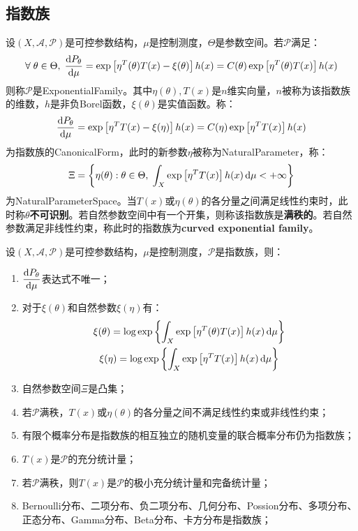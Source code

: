 \subsection{指数族}
\begin{definition}
	设$(X,\mathscr{A},\mathscr{P})$是可控参数结构，$\mu$是控制测度，$\Theta$是参数空间。若$\mathscr{P}$满足：
	\begin{equation*}
		\forall\;\theta\in\Theta,\;\frac{\mathop{}\!\mathrm{d} P_{\theta}}{\mathop{}\!\mathrm{d}\mu}=\exp\left[\eta^T(\theta)T(x)-\xi(\theta)\right]h(x)=C(\theta)\exp\left[\eta^T(\theta)T(x)\right]h(x)
	\end{equation*}
	则称$\mathscr{P}$是\gls{ExponentialFamily}。其中$\eta(\theta),T(x)$是$n$维实向量，$n$被称为该指数族的维数，$h$是非负Borel函数，$\xi(\theta)$是实值函数。称：
	\begin{equation*}
		\frac{\mathop{}\!\mathrm{d} P_{\theta}}{\mathop{}\!\mathrm{d}\mu}=\exp\left[\eta^TT(x)-\xi(\eta)\right]h(x)=C(\eta)\exp\left[\eta^TT(x)\right]h(x)
	\end{equation*}
	为指数族的\gls{CanonicalForm}，此时的新参数$\eta$被称为\gls{NaturalParameter}，称：
	\begin{equation*}
		\Xi=\left\{\eta(\theta):\theta\in\Theta,\;\int_{X}\exp\left[\eta^TT(x)\right]h(x)\mathop{}\!\mathrm{d}\mu<+\infty\right\}
	\end{equation*}
	为\gls{NaturalParameterSpace}。当$T(x)$或$\eta(\theta)$的各分量之间满足线性约束时，此时称$\theta$\textbf{不可识别}。若自然参数空间中有一个开集，则称该指数族是\textbf{满秩的}。若自然参数满足非线性约束，称此时的指数族为\textbf{curved exponential family}。
\end{definition}
\begin{property}\label{prop:ExponentialFamily}
	设$(X,\mathscr{A},\mathscr{P})$是可控参数结构，$\mu$是控制测度，$\mathscr{P}$是指数族，则：
	\begin{enumerate}
		\item $\dfrac{\mathop{}\!\mathrm{d} P_{\theta}}{\mathop{}\!\mathrm{d}\mu}$表达式不唯一；
		\item 对于$\xi(\theta)$和自然参数$\xi(\eta)$有：
		\begin{gather*}
			\xi(\theta)=\log\exp\left\{\int_{X}\exp\left[\eta^T(\theta)T(x)\right]h(x)\mathop{}\!\mathrm{d}\mu\right\} \\
			\xi(\eta)=\log\exp\left\{\int_{X}\exp\left[\eta^TT(x)\right]h(x)\mathop{}\!\mathrm{d}\mu\right\}
		\end{gather*}
		\item 自然参数空间$\Xi$是凸集；
		\item 若$\mathscr{P}$满秩，$T(x)$或$\eta(\theta)$的各分量之间不满足线性约束或非线性约束；
		\item 有限个概率分布是指数族的相互独立的随机变量的联合概率分布仍为指数族；
		\item $T(x)$是$\mathscr{P}$的充分统计量；
		\item 若$\mathscr{P}$满秩，则$T(x)$是$\mathscr{P}$的极小充分统计量和完备统计量；
		\item Bernoulli分布、二项分布、负二项分布、几何分布、Possion分布、多项分布、正态分布、Gamma分布、Beta分布、卡方分布是指数族；
	\end{enumerate}
\end{property}
